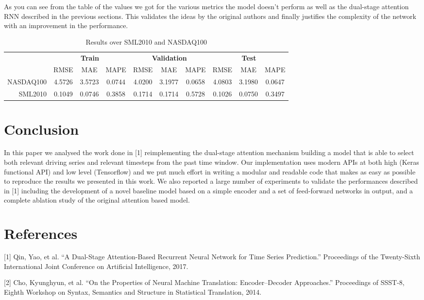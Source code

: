 \documentclass{article}
\begin{document}
As you can see from the table of the values we got for the various metrics the 
model doesn't perform as well as the dual-stage attention RNN described in the 
previous sections. This validates the ideas by the original authors and finally 
justifies the complexity of the network with an improvement in the 
performance.


\begin{center}
\begin{table}
\begin{tabular}{r|c|c|c|c|c|c|c|c|c|}
\multicolumn{1}{r}{}
  & \multicolumn{3}{c}{\textbf{Train}}
  & \multicolumn{3}{c}{\textbf{Validation}}
  & \multicolumn{3}{c}{\textbf{Test}} \\
  \cline{2-10}
  & \multicolumn{1}{c}{RMSE}
  & \multicolumn{1}{c}{MAE}
  & \multicolumn{1}{c|}{MAPE}
  & \multicolumn{1}{c}{RMSE}
  & \multicolumn{1}{c}{MAE}
  & \multicolumn{1}{c|}{MAPE}
  & \multicolumn{1}{c}{RMSE}
  & \multicolumn{1}{c}{MAE}
  & \multicolumn{1}{c|}{MAPE}\\
\cline{2-10}
NASDAQ100 & 4.5726 & 3.5723 & 0.0744 & 4.0200 & 3.1977 & 0.0658 & 4.0803 &
3.1980 & 0.0647 \\
\cline{2-10}
SML2010 & 0.1049 & 0.0746 & 0.3858 & 0.1714 & 0.1714 & 0.5728 & 0.1026 & 0.0750
& 0.3497 \\
\cline{2-10}
\end{tabular}
\vspace{1em}
\caption{Results over SML2010 and NASDAQ100}
\label{results-encoder}
\end{table}
\end{center}

\section{Conclusion}

In this paper we analysed the work done in [1] reimplementing the dual-stage 
attention mechanism building a model that is able to select both relevant driving 
series and relevant timesteps from the past time window. Our implementation uses 
modern APIs at both high (Keras functional API) and low level (Tensorflow) and we 
put much effort in writing a modular and readable code that makes as easy as 
possible to reproduce the results we presented in this work. We also reported a 
large number of experiments to validate the performances described in [1] 
including the development of a novel baseline model based on a simple encoder and 
a set of feed-forward networks in output, and a complete ablation study of the 
original attention based model.

\newpage
\section*{References}
[1] Qin, Yao, et al. “A Dual-Stage Attention-Based Recurrent Neural Network for
Time Series Prediction.” Proceedings of the Twenty-Sixth International Joint
Conference on Artificial Intelligence, 2017.

[2] Cho, Kyunghyun, et al. “On the Properties of Neural Machine Translation:
Encoder–Decoder Approaches.” Proceedings of SSST-8, Eighth Workshop on Syntax,
Semantics and Structure in Statistical Translation, 2014.
\end{document}

